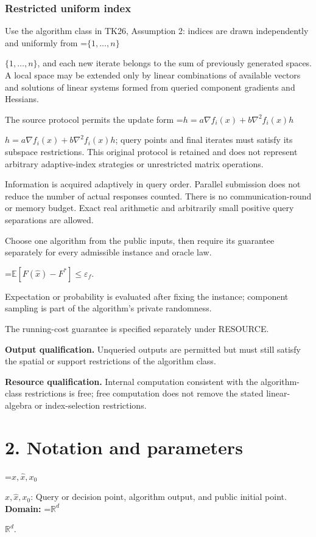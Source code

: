 \documentclass[10pt,a4paper]{article}
\newcommand{\AtlasMath}[1]{\par\begingroup\centering\setbox0=\hbox{$\displaystyle #1$}\ifdim\wd0>1.4\linewidth\typeout{ATLAS WIDE FORMULA: \the\wd0}\fi\ifdim\wd0>\linewidth\resizebox{\linewidth}{!}{\box0}\else\box0\fi\par\endgroup}
\newcommand{\AtlasInlineMath}[1]{\begingroup\setbox0=\hbox{$#1$}\ifdim\wd0>.4\linewidth\endgroup\AtlasMath{#1}\else\endgroup$#1$\fi}
\begin{document}
\subsubsection{Restricted uniform index}
Use the algorithm class in TK26, Assumption 2: indices are drawn independently and uniformly from \AtlasInlineMath{\{1,\ldots,n\}}, and each new iterate belongs to the sum of previously generated spaces. A local space may be extended only by linear combinations of available vectors and solutions of linear systems formed from queried component gradients and Hessians.

The source protocol permits the update form \AtlasInlineMath{h=a\nabla f_i(x)+b\nabla^2f_i(x)h}; query points and final iterates must satisfy its subspace restrictions. This original protocol is retained and does not represent arbitrary adaptive-index strategies or unrestricted matrix operations.

Information is acquired adaptively in query order. Parallel submission does not reduce the number of actual responses counted. There is no communication-round or memory budget. Exact real arithmetic and arbitrarily small positive query separations are allowed.

Choose one algorithm from the public inputs, then require its guarantee separately for every admissible instance and oracle law.


\AtlasMath{\mathbb{E}\!\left[F(\widehat{x})-F^*\right]\le \varepsilon_f.}


Expectation or probability is evaluated after fixing the instance; component sampling is part of the algorithm's private randomness.

The running-cost guarantee is specified separately under RESOURCE.

\textbf{Output qualification.} Unqueried outputs are permitted but must still satisfy the spatial or support restrictions of the algorithm class.

\textbf{Resource qualification.} Internal computation consistent with the algorithm-class restrictions is free; free computation does not remove the stated linear-algebra or index-selection restrictions.

\section{2. Notation and parameters}
\AtlasInlineMath{x,\widehat{x},x_0}: Query or decision point, algorithm output, and public initial point. \textbf{Domain:} \AtlasInlineMath{\mathbb{R}^d}.
\end{document}
